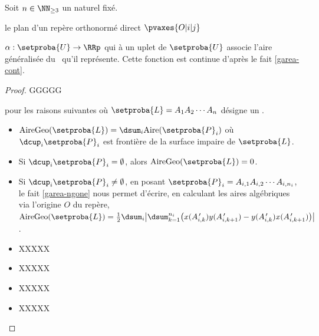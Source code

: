 

\begin{fact} \label{garea-cont}
    Soit $n \in \NN_{\geq3}$ un naturel fixé.
   
   
   le plan d'un repère orthonormé direct $\pvaxes{O | i | j}$
   
   
    $\alpha: \setproba{U} \rightarrow \RRp$ qui à un uplet de $\setproba{U}$ associe l'aire généralisée du \ncycle\ qu'il représente.
        Cette fonction est continue d'après le fait \ref{garea-cont}.
\end{fact}


\begin{proof}
	GGGGG
	
	
	pour les raisons suivantes où $\setproba{L} = A_1 A_2 \cdots A_n$ désigne un \ncycle.
    \begin{itemize}
        \item $\geoarea{\setproba{L}} = \dsum_{i} \area{\setproba{P}_i}$ où $\dcup_{i} \setproba{P}_i$ est frontière de la surface impaire de $\setproba{L}$.


		\item Si $\dcup_{i} \setproba{P}_i = \emptyset$, alors $\geoarea{\setproba{L}} = 0$.


		\item Si $\dcup_{i} \setproba{P}_i \neq \emptyset$, 
		en posant $\setproba{P}_i = A_{i,1} A_{i,2} \cdots A_{i,n_i}$, 
		le fait \ref{garea-ngone} nous permet d'écrire, en calculant les aires algébriques via l'origine $O$ du repère,
		$ \geoarea{\setproba{L}} 
		= \frac12 \dsum_{i} \big\lvert
			\dsum_{k=1}^{n_i} \big( 
				  x(A^{\,\prime}_{i,k}) y(A^{\,\prime}_{i,k+1}) 
				- y(A^{\,\prime}_{i,k}) x(A^{\,\prime}_{i,k+1})
			\big)
		 \big\rvert$
		.

		\item XXXXX

		\item XXXXX

		\item XXXXX

		\item XXXXX
    \end{itemize}

	\null\vspace{-6ex}
\end{proof}

